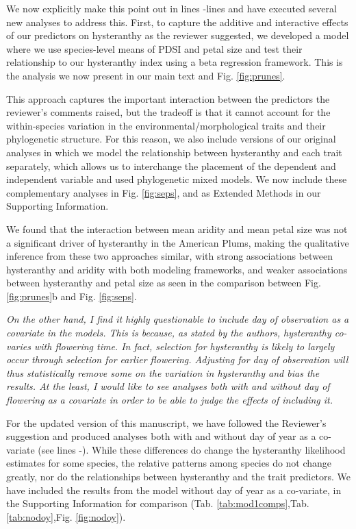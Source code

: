 \documentclass{article}[12pt]
\begin{document}
We now explicitly make this point out in lines -lines  and have executed several new analyses to address this. First, to capture the additive and interactive effects of our predictors on hysteranthy  as the reviewer suggested, we developed a model where we use species-level means of PDSI and petal size and test their relationship to our hysteranthy index using a beta regression framework. This is the analysis we now present in our main text and Fig. \ref{fig:prunes}.

This approach captures the important interaction between the predictors the reviewer's comments raised, but the tradeoff is that it cannot account for the within-species variation in the environmental/morphological traits and their phylogenetic structure. For this reason, we also include versions of our original analyses in which we model the relationship between hysteranthy and each trait separately, which allows us to interchange the placement of the dependent and independent variable and used phylogenetic mixed models. We now include these complementary analyses in Fig. \ref{fig:seps}, and as Extended Methods in our Supporting Information.

We found that the interaction between mean aridity and mean petal size was not a significant driver of hysteranthy in the American Plums, making the qualitative inference from these two approaches similar, with strong associations between hysteranthy and aridity with both modeling frameworks, and weaker associations between hysteranthy and petal size as seen in the comparison between Fig. \ref{fig:prunes}b and Fig. \ref{fig:seps}.


\emph{On the other hand, I find it highly questionable to include day of observation as a covariate in the models. This is because, as stated by the authors, hysteranthy co-varies with flowering time. In fact, selection for hysteranthy is likely to largely occur through selection for earlier flowering. Adjusting for day of observation will thus statistically remove some on the variation in hysteranthy and bias the results. At the least, I would like to see analyses both with and without day of flowering as a covariate in order to be able to judge the effects of including it.}

For the updated version of this manuscript, we  have followed the Reviewer's suggestion and produced analyses both with and without day of year as a co-variate (see lines -). While these differences do change the hysteranthy likelihood estimates for some species, the relative patterns among species do not change greatly, nor do the relationships between hysteranthy and the trait predictors. We have included the results from the model without day of year as a co-variate, in the Supporting Information for comparison (Tab. \ref{tab:mod1comps},Tab. \ref{tab:nodoy},Fig. \ref{fig:nodoy}).
\end{document}
